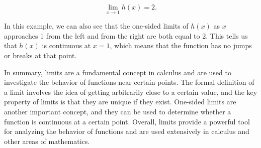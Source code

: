 \documentclass{article}
\begin{document}
\[
\lim_{x\to 1} h(x) = 2.
\]

In this example, we can also see that the one-sided limits of $h(x)$ as $x$ approaches 1 from the left and from the right are both equal to 2. This tells us that $h(x)$ is continuous at $x=1$, which means that the function has no jumps or breaks at that point.

In summary, limits are a fundamental concept in calculus and are used to investigate the behavior of functions near certain points. The formal definition of a limit involves the idea of getting arbitrarily close to a certain value, and the key property of limits is that they are unique if they exist. One-sided limits are another important concept, and they can be used to determine whether a function is continuous at a certain point. Overall, limits provide a powerful tool for analyzing the behavior of functions and are used extensively in calculus and other areas of mathematics.
\end{document}
